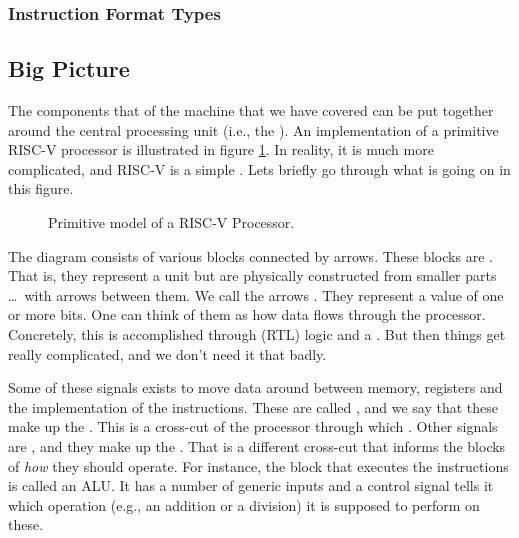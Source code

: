 \subsubsection{Instruction Format Types}


\subsection{Big Picture}

The components that of the machine that we have covered can be put together around the central processing unit (i.e., the ). An implementation of a primitive RISC-V processor is illustrated in figure \ref{fig:machine:riscv}. In reality, it is much more complicated, and RISC-V is a simple . Lets briefly go through what is going on in this figure.

\begin{figure}[tbp]
  
  \caption{Primitive model of a RISC-V Processor.}
  \label{fig:machine:riscv}
\end{figure}

The diagram consists of various blocks connected by arrows. These blocks are . That is, they represent a  unit but are physically constructed from smaller parts \ldots\ with arrows between them. We call the arrows . They represent a value of one or more bits. One can think of them as how data flows through the processor. Concretely, this is accomplished through  (RTL) logic and a . But then things get really complicated, and we don't need it that badly.

Some of these signals exists to move data around between memory, registers and the implementation of the instructions. These are called , and we say that these make up the . This is a cross-cut of the processor through which . Other signals are , and they make up the . That is a different cross-cut that informs the blocks of \textsl{how} they should operate. For instance, the block that executes the instructions is called an ALU. It has a number of generic inputs and a control signal tells it which operation (e.g., an addition or a division) it is supposed to perform on these.

